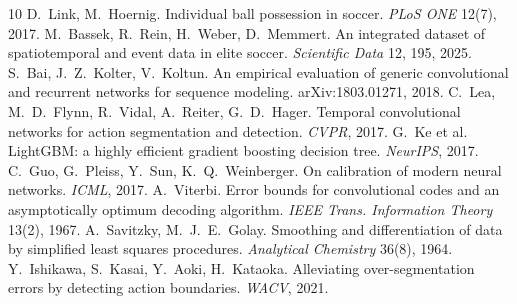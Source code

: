 \documentclass[10pt,a4paper]{article}
\begin{document}
\begin{thebibliography}{10}\scriptsize\setlength{\itemsep}{0pt}
 D.~Link, M.~Hoernig. Individual ball possession in soccer. \emph{PLoS ONE} 12(7), 2017.
 M.~Bassek, R.~Rein, H.~Weber, D.~Memmert. An integrated dataset of spatiotemporal and event data in elite soccer. \emph{Scientific Data} 12, 195, 2025.
 S.~Bai, J.~Z.~Kolter, V.~Koltun. An empirical evaluation of generic convolutional and recurrent networks for sequence modeling. arXiv:1803.01271, 2018.
 C.~Lea, M.~D.~Flynn, R.~Vidal, A.~Reiter, G.~D.~Hager. Temporal convolutional networks for action segmentation and detection. \emph{CVPR}, 2017.
 G.~Ke et al. LightGBM: a highly efficient gradient boosting decision tree. \emph{NeurIPS}, 2017.
 C.~Guo, G.~Pleiss, Y.~Sun, K.~Q.~Weinberger. On calibration of modern neural networks. \emph{ICML}, 2017.
 A.~Viterbi. Error bounds for convolutional codes and an asymptotically optimum decoding algorithm. \emph{IEEE Trans. Information Theory} 13(2), 1967.
 A.~Savitzky, M.~J.~E.~Golay. Smoothing and differentiation of data by simplified least squares procedures. \emph{Analytical Chemistry} 36(8), 1964.
 Y.~Ishikawa, S.~Kasai, Y.~Aoki, H.~Kataoka. Alleviating over-segmentation errors by detecting action boundaries. \emph{WACV}, 2021.
\end{thebibliography}
\end{document}
